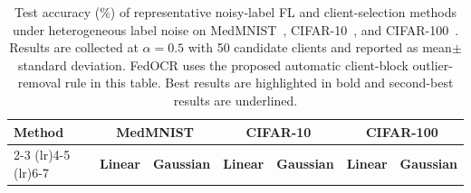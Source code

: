 ﻿\documentclass[conference]{IEEEtran}
\theoremstyle{definition}
\theoremstyle{remark}
\begin{document}
\begin{table}[!t]
	\centering
	\caption{\normalfont Test accuracy (\%) of representative noisy-label FL and client-selection methods under heterogeneous label noise on MedMNIST~\cite{yang2023medmnist}, CIFAR-10~\cite{krizhevsky2009learning}, and CIFAR-100~\cite{krizhevsky2009learning}. Results are collected at $\alpha=0.5$ with 50 candidate clients and reported as mean$\pm$standard deviation. FedOCR uses the proposed automatic client-block outlier-removal rule in this table. Best results are highlighted in bold and second-best results are underlined.}
	\label{tab:noisy_fl_accuracy}
	\setlength{\tabcolsep}{3.2pt}
	\renewcommand{\arraystretch}{1.15}
	\begin{tabular}{lcccccc}
		\toprule
		\multirow{2}{*}{\textbf{Method}} 
		& \multicolumn{2}{c}{\textbf{MedMNIST}} 
		& \multicolumn{2}{c}{\textbf{CIFAR-10}} 
		& \multicolumn{2}{c}{\textbf{CIFAR-100}} \\
		\cmidrule(lr){2-3} \cmidrule(lr){4-5} \cmidrule(lr){6-7}
		& \textbf{Linear} & \textbf{Gaussian} & \textbf{Linear} & \textbf{Gaussian} & \textbf{Linear} & \textbf{Gaussian} \\
		\midrule
		

\end{tabular}
\end{table}
\end{document}
